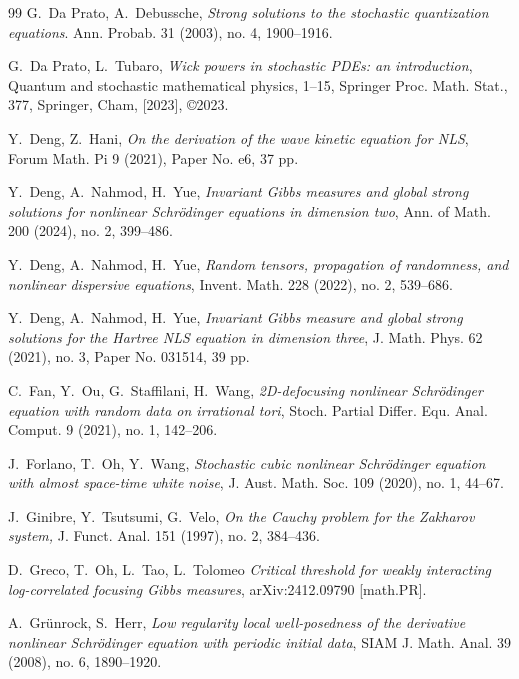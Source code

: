 \documentclass[%
11pt,  reqno]{amsart}
\newcommand{\1}{\hspace{0.2mm}\text{I}\hspace{0.2mm}}
\numberwithin{equation}{section}
\numberwithin{theorem}{section}
\begin{document}
\begin{thebibliography}{99}
G.~Da Prato, A.~Debussche,
{\it Strong solutions to the stochastic quantization equations}.
Ann. Probab. 31 (2003), no. 4, 1900--1916.



G.~Da Prato, L.~Tubaro, 
{\it Wick powers in stochastic PDEs: an introduction}, Quantum and stochastic mathematical physics, 1--15, Springer Proc. Math. Stat., 377, Springer, Cham, [2023], \copyright2023. 


Y.~Deng, Z.~Hani, 
{\it On the derivation of the wave kinetic equation for NLS}, 
Forum Math. Pi 9 (2021), Paper No. e6, 37 pp. 

  Y.~Deng, A.~Nahmod,  H.~Yue,
  {\it Invariant Gibbs measures and global strong
  solutions for nonlinear Schr{\"o}dinger equations in dimension two},
  Ann. of Math.  200 (2024), no. 2, 399--486.

  Y.~Deng, A.~Nahmod,  H.~Yue,
  {\it Random tensors, propagation of randomness, and
  nonlinear dispersive equations}, 
  Invent.
  Math. 228 (2022), no. 2, 539--686.


Y.~Deng, A.~Nahmod, H.~Yue,
{\it Invariant Gibbs measure and global strong solutions for the Hartree NLS equation in dimension three},
 J. Math. Phys. 62 (2021), no. 3, Paper No. 031514, 39 pp. 



C.~Fan, Y.~Ou, G.~Staffilani, H.~Wang, 
{\it 2D-defocusing nonlinear Schr\"odinger equation with random data on irrational tori},
Stoch. Partial Differ. Equ. Anal. Comput. 9 (2021), no. 1, 142--206. 

J.~Forlano, T.~Oh, Y.~Wang,
{\it  Stochastic cubic nonlinear Schr\"odinger equation with almost space-time white noise}, J. Aust. Math. Soc. 109 (2020), no. 1, 44--67. 


J.~Ginibre, Y.~Tsutsumi, G.~Velo, 
{\it On the Cauchy problem for the Zakharov system,} J. Funct. Anal. 151 (1997), no. 2, 384--436.




D.~Greco, T.~Oh, L.~Tao, L.~Tolomeo
{\it Critical threshold for weakly interacting log-correlated focusing Gibbs measures}, 
arXiv:2412.09790 [math.PR].


A.~Gr\"unrock, S.~Herr, 
{\it Low regularity local well-posedness of the derivative nonlinear Schr\"odinger equation with periodic initial data}, SIAM J. Math. Anal. 39 (2008), no. 6, 1890--1920.



\end{thebibliography}
\end{document}
